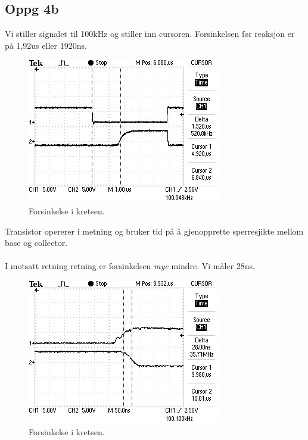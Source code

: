 \subsection{Oppg 4b}
Vi stiller signalet til 100kHz og stiller inn cursoren.
Forsinkelsen før reaksjon er på 1,92us eller 1920ns.
\begin{figure}[!ht]
  \caption{Forsinkelse i kretsen.}
  \centering
    \includegraphics[width=\textwidth]{4b.jpg}
\end{figure}
Transistor opererer i metning og bruker tid på å gjenopprette
sperresjikte mellom base og collector.
\\\\
I motsatt retning retning er forsinkelsen \emph{mye} mindre.
Vi måler 28ns.
\begin{figure}[!ht]
  \caption{Forsinkelse i kretsen.}
  \centering
    \includegraphics[width=\textwidth]{4bb.jpg}
\end{figure}
